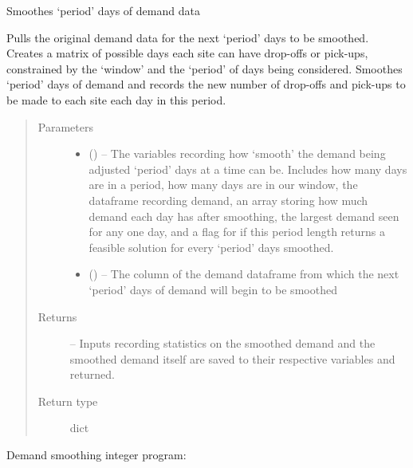 \documentclass[letterpaper,10pt,english]{sphinxmanual}
\begin{document}
\begin{fulllineitems}
\label{\detokenize{variation:smoothing.iterate}}
Smoothes `period' days of demand data

Pulls the original demand data for the next `period' days to be smoothed.
Creates a matrix of possible days each site can have drop-offs or pick-ups,
constrained by the `window' and the `period' of days being considered.
Smoothes `period' days of demand and records the new number of drop-offs
and pick-ups to be made to each site each day in this period.
\begin{quote}\begin{description}
\item[{Parameters}] \leavevmode\begin{itemize}
\item {} 
 () -- The variables recording how `smooth' the demand being adjusted `period'
days at a time can be. Includes how many days are in a period, how many
days are in our window, the dataframe recording demand, an array
storing how much demand each day has after smoothing, the largest
demand seen for any one day, and a flag for if this period length
returns a feasible solution for every `period' days smoothed.

\item {} 
 () -- The column of the demand dataframe from which the next `period' days
of demand will begin to be smoothed

\end{itemize}

\item[{Returns}] \leavevmode
{} -- Inputs recording statistics on the smoothed demand and the smoothed
demand itself are saved to their respective variables and returned.

\item[{Return type}] \leavevmode
dict

\end{description}\end{quote}

\end{fulllineitems}


Demand smoothing integer program:
\end{document}
